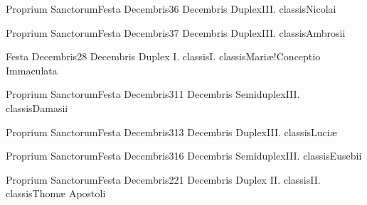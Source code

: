 \documentclass[psalterium-feriale.tex]{subfiles}
\begin{document}
	{Proprium Sanctorum}{Festa Decembris}{3}{6 Decembris}
	{Duplex}{III. classis}{Nicolai}
	{}
	{}
\COPObRubric

	{Proprium Sanctorum}{Festa Decembris}{3}{7 Decembris}
	{Duplex}{III. classis}{Ambrosii}
	{}
	{}
\COPOcRubric

	{Festa Decembris}{2}{8 Decembris}
	{Duplex I. classis}{I. classis}{Mariæ!Conceptio Immaculata}
	{}
	{}
\psalmodiapropria


	{Proprium Sanctorum}{Festa Decembris}{3}{11 Decembris}
	{Semiduplex}{III. classis}{Damasii}
	{}
	{}
\COPOaRubric

	{Proprium Sanctorum}{Festa Decembris}{3}{13 Decembris}
	{Duplex}{III. classis}{Luciæ}
	{}
	{}
\MUVMbRubric

	{Proprium Sanctorum}{Festa Decembris}{3}{16 Decembris}
	{Semiduplex}{III. classis}{Eusebii}
	{}
	{}
\UMEXaRubric

	{Proprium Sanctorum}{Festa Decembris}{2}{21 Decembris}
	{Duplex II. classis}{II. classis}{Thomæ Apostoli}
	{}
	{}
\psalmodiapropria
\end{document}
